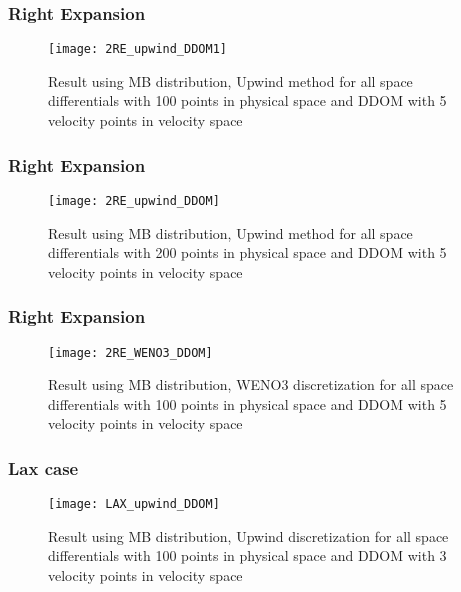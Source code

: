
\begin{frame}
	\frametitle{Right Expansion}
		
		\begin{figure}
			\centering
				\texttt{[image: 2RE\_upwind\_DDOM1]}
			\caption{Result using MB distribution, Upwind method for all space differentials with 100 points in physical space and DDOM with 5 velocity points in velocity space}
			\label{fig:MB_RE_DDOM}
		\end{figure}
		
\end{frame}

\begin{frame}
	\frametitle{Right Expansion}
		
		\begin{figure}
			\centering
				\texttt{[image: 2RE\_upwind\_DDOM]}
			\caption{Result using MB distribution, Upwind method for all space differentials with 200 points in physical space and DDOM with 5 velocity points in velocity space}
			\label{fig:MB_RE_DDOM_2}
		\end{figure}
		
\end{frame}

\begin{frame}
	\frametitle{Right Expansion}
		
		\begin{figure}
			\centering
				\texttt{[image: 2RE\_WENO3\_DDOM]}
			\caption{Result using MB distribution, WENO3 discretization for all space differentials with 100 points in physical space and DDOM with 5 velocity points in velocity space}
			\label{fig:MB_RE_WENO_DDOM}
		\end{figure}
		
\end{frame}

\begin{frame}
	\frametitle{Lax case}
		
		\begin{figure}
			\centering
				\texttt{[image: LAX\_upwind\_DDOM]}
			\caption{Result using MB distribution, Upwind discretization for all space differentials with 100 points in physical space and DDOM with 3 velocity points in velocity space}
			\label{fig:MB_Lax_DDOM}
		\end{figure}
		
\end{frame}

